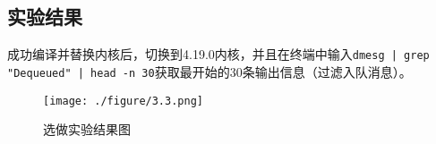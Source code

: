 \documentclass[11pt, a4paper, oneside,UTF8]{ctexart}
\begin{document}
\subsection{实验结果}
成功编译并替换内核后，切换到4.19.0内核，并且在终端中输入\texttt{dmesg | grep "Dequeued" | head -n 30}获取最开始的30条输出信息（过滤入队消息）。

\begin{figure}[ht]
  \centering
  \texttt{[image: ./figure/3.3.png]}
  \caption{选做实验结果图}
  \label{figure:3.3}
\end{figure}
\end{document}
